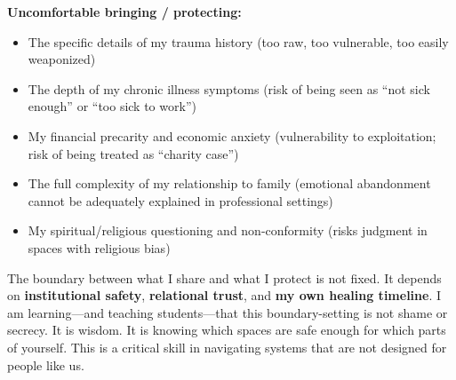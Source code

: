 \documentclass[10pt]{article}
\begin{document}
\noindent\textbf{Uncomfortable bringing / protecting:}
\begin{itemize}
\item The specific details of my trauma history (too raw, too vulnerable, too easily weaponized)
\item The depth of my chronic illness symptoms (risk of being seen as ``not sick enough'' or ``too sick to work'')
\item My financial precarity and economic anxiety (vulnerability to exploitation; risk of being treated as ``charity case'')
\item The full complexity of my relationship to family (emotional abandonment cannot be adequately explained in professional settings)
\item My spiritual/religious questioning and non-conformity (risks judgment in spaces with religious bias)
\end{itemize}

The boundary between what I share and what I protect is not fixed. It depends on \textbf{institutional safety}, \textbf{relational trust}, and \textbf{my own healing timeline}. I am learning---and teaching students---that this boundary-setting is not shame or secrecy. It is wisdom. It is knowing which spaces are safe enough for which parts of yourself. This is a critical skill in navigating systems that are not designed for people like us.





\end{document}
